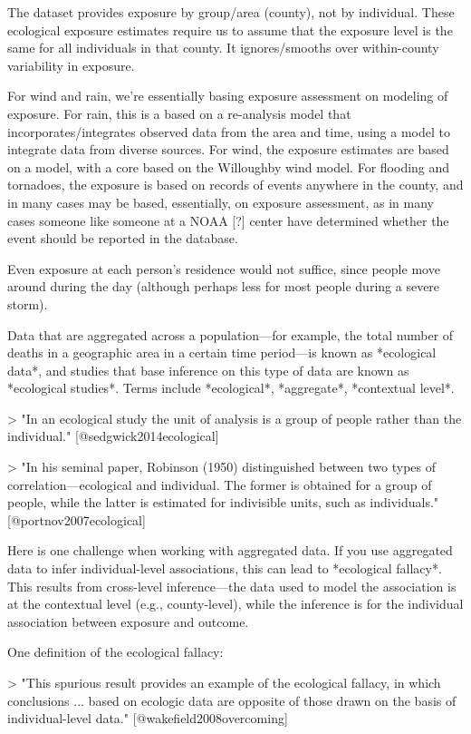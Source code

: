 The dataset provides exposure by group/area (county), not by individual. These
ecological exposure estimates require us to assume that the exposure level is
the same for all individuals in that county. It ignores/smooths over
within-county variability in exposure.

For wind and rain, we're essentially basing exposure assessment on modeling of
exposure. For rain, this is a based on a re-analysis model that
incorporates/integrates observed data from the area and time, using a model to
integrate data from diverse sources. For wind, the exposure estimates are based
on a model, with a core based on the Willoughby wind model. For flooding and
tornadoes, the exposure is based on records of events anywhere in the county,
and in many cases may be based, essentially, on exposure assessment, as in many
cases someone like someone at a NOAA [?] center have determined whether the
event should be reported in the database.

Even exposure at each person's residence would not suffice, since people move 
around during the day (although perhaps less for most people during a severe
storm).

Data that are aggregated across a population---for example, the total number of
deaths in a geographic area in a certain time period---is known as *ecological
data*, and studies that base inference on this type of data are known as
*ecological studies*. Terms include *ecological*, *aggregate*, *contextual
level*.

> "In an ecological study the unit of analysis is a group of people rather than 
the individual." [@sedgwick2014ecological]

> "In his seminal paper, Robinson (1950) distinguished between two types of
correlation---ecological and individual. The former is obtained for a group of
people, while the latter is estimated for indivisible units, such as
individuals." [@portnov2007ecological]

Here is one challenge when working with aggregated data. If you use aggregated
data to infer individual-level associations, this can lead to *ecological fallacy*. 
This results from cross-level inference---the data used to model the association
is at the contextual level (e.g., county-level), while the inference is for the
individual association between exposure and outcome. 

One definition of the ecological fallacy: 

> "This spurious result provides an example of the ecological fallacy, in 
which conclusions ... based on ecologic data are opposite of those drawn 
on the basis of individual-level data." [@wakefield2008overcoming]

